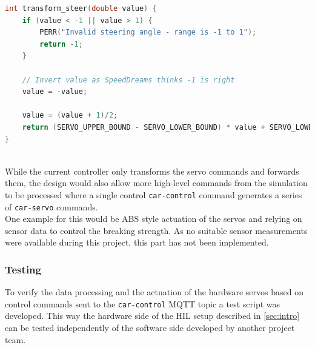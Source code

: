 \begin{minipage}{\linewidth}
\begin{lstlisting}[style=mylistings, language=c, label=lst:panda-tsteer, caption=Algorithm for  calculating the steering servo commands]
int transform_steer(double value) {
	if (value < -1 || value > 1) {
		PERR("Invalid steering angle - range is -1 to 1");
		return -1;
	}

	// Invert value as SpeedDreams thinks -1 is right
	value = -value;

	value = (value + 1)/2;
	return (SERVO_UPPER_BOUND - SERVO_LOWER_BOUND) * value + SERVO_LOWER_BOUND;
}
\end{lstlisting}
\end{minipage} \\

%


While the current controller only transforms the servo commands and forwards them, the design would also allow more high-level commands from the simulation to be processed where a single control \texttt{car-control} command generates a series of \texttt{car-servo} commands. \\

One example for this would be ABS style actuation of the servos and relying on sensor data to control the breaking strength.
As no suitable sensor measurements were available during this project, this part has not been implemented.

\subsubsection{Testing}
\label{sec:panda-testing}
To verify the data processing and the actuation of the hardware servos based on control commands sent to the \texttt{car-control} MQTT topic a test script was developed.
This way the hardware side of the HIL setup described in \autoref{sec:intro} can be tested independently of the software side developed by another project team. \\

